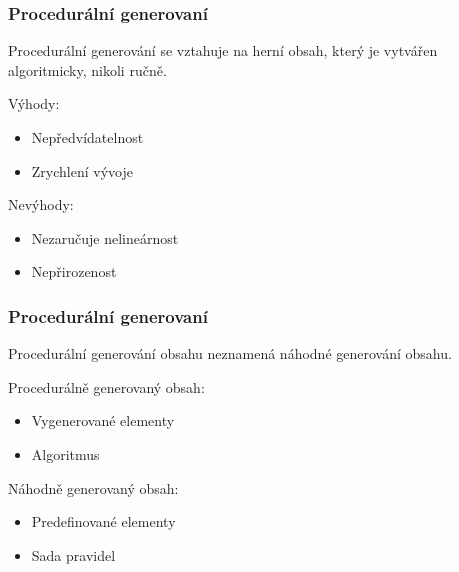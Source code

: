\documentclass{beamer}
\begin{document}
\begin{frame}
\frametitle{Procedurální generovaní}
Procedurální generování se vztahuje na herní obsah, který je vytvářen algoritmicky, nikoli ručně.
	\begin{multicols}{2}
		Výhody:
  		\begin{itemize}
  			\item Nepředvídatelnost
 			\item Zrychlení vývoje
		\end{itemize}
		Nevýhody:
		\begin{itemize}
 			\item Nezaručuje nelineárnost
 			\item Nepřirozenost
		\end{itemize}
	\end{multicols}		
\end{frame}	

\begin{frame}	
	\frametitle{Procedurální generovaní}
	Procedurální generování obsahu neznamená náhodné generování obsahu.	
	\begin{multicols}{2}
		Procedurálně generovaný obsah:
  		\begin{itemize}
 			\item Vygenerované elementy
			\item Algoritmus 
		\end{itemize}
		Náhodně generovaný obsah:
		\begin{itemize}
 			\item Predefinované elementy
 			\item Sada pravidel
		\end{itemize}
	\end{multicols}		
\end{frame}
	
\end{document}
